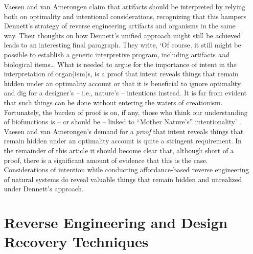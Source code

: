 Vaesen and van Amerongen claim that artifacts should be interpreted by
relying both on optimality and intentional considerations, recognizing
that this hampers Dennett’s strategy of reverse engineering artifacts
and organisms in the same way.\citep[][pgs. 794--795]{vaesenamerongen2008} Their thoughts on
how Dennett’s unified approach might still be achieved leads to an
interesting final paragraph. They write, ‘Of course, it still might be
possible to establish a generic interpretive program, including
artifacts \textit{and} biological items… What is needed to argue for
the importance of intent in the interpretation of organ(ism)s, is a
proof that intent reveals things that remain hidden under an optimality
account or that it is beneficial to ignore optimality and dig for a
designer’s – i.e., nature’s – intentions instead. It is far from
evident that such things can be done without entering the waters of
creationism. Fortunately, the burden of proof is on, if any, those who
think our understanding of biofunctions is – or should be – linked to
“Mother Nature’s” intentionality’ \citep[][pg. 795]{vaesenamerongen2008}. Vaesen and van
Amerongen’s demand for a \textit{proof} that intent reveals things that
remain hidden under an optimality account is quite a stringent
requirement. In the remainder of this article it should become clear
that, although short of a proof, there is a significant amount of
evidence that this is the case. Considerations of intention while
conducting affordance-based reverse engineering of natural systems do
reveal valuable things that remain hidden and unrealized under
Dennett’s approach.

\section{Reverse Engineering and Design Recovery Techniques}

